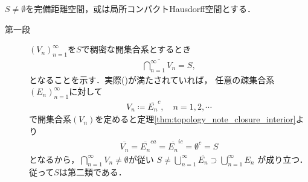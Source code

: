 	\begin{prf} $S \neq \emptyset$を完備距離空間，或は局所コンパクトHausdorff空間とする．\mbox{}
		\begin{description}
			\item[第一段]
				$(V_n)_{n=1}^\infty$を$S$で稠密な開集合系とするとき
				\begin{align}
					\overline{\bigcap_{n=1}^\infty V_n} = S,
					\label{eq:thm_Baire_category_theorem_1}
				\end{align}
				となることを示す．実際()が満たされていれば，
				任意の疎集合系$(E_n)_{n=1}^\infty$に対して
				\begin{align}
					V_n \coloneqq \overline{E_n}^c,
					\quad n=1,2,\cdots
				\end{align}
				で開集合系$(V_n)$を定めると定理\ref{thm:topology_note_closure_interior}より
				\begin{align}
					\overline{V_n} = \overline{E_n}^{ca} = \overline{E_n}^{ic} = \emptyset^c = S
				\end{align}
				となるから，$\bigcap_{n=1}^\infty V_n \neq \emptyset$が従い
				$S \neq \bigcup_{n=1}^\infty \overline{E_n} \supset \bigcup_{n=1}^\infty E_n$
				が成り立つ．従って$S$は第二類である．
				

\end{description}
\end{prf}
